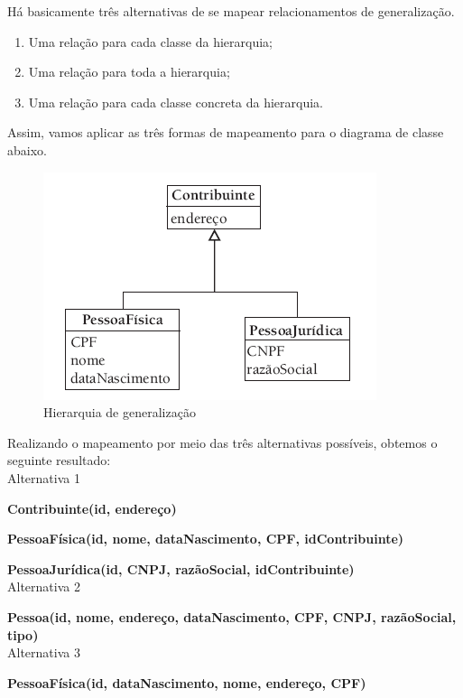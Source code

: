 
Há basicamente três alternativas de se mapear relacionamentos de generalização.

\begin{enumerate}
	\item Uma relação para cada classe da hierarquia;
	\item Uma relação para toda a hierarquia;
	\item Uma relação para cada classe concreta da hierarquia.
\end{enumerate}

Assim, vamos aplicar as três formas de mapeamento para o diagrama de classe abaixo.

\begin{figure}[H]
	\centering
	\includegraphics[scale=0.7]{imagens/generalizacao.png}
	\caption{Hierarquia de generalização}
	\label{fig:figura-01-banco-07}
\end{figure}

Realizando o mapeamento por meio das três alternativas possíveis, obtemos o seguinte resultado:
\\

Alternativa 1

\textbf{Contribuinte(id, endereço)}

\textbf{PessoaFísica(id, nome, dataNascimento, CPF, idContribuinte)}

\textbf{PessoaJurídica(id, CNPJ, razãoSocial, idContribuinte)}
\\

Alternativa 2

\textbf{Pessoa(id, nome, endereço, dataNascimento, CPF, CNPJ, razãoSocial, tipo)
}
\\

Alternativa 3

\textbf{PessoaFísica(id, dataNascimento, nome, endereço, CPF)}

